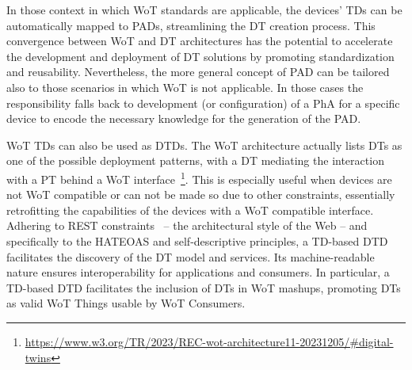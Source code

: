 In those context in which \ac{WoT} standards are applicable, the devices' \acp{TD} can be automatically mapped to \acp{PAD}, streamlining the \ac{DT} creation process.
%
This convergence between \ac{WoT} and \ac{DT} architectures has the potential to accelerate the development and deployment of \ac{DT} solutions by promoting standardization and reusability.
%
Nevertheless, the more general concept of \ac{PAD} can be tailored also to those scenarios in which \ac{WoT} is not applicable. In those cases the responsibility falls back to development (or configuration) of a \ac{PhA} for a specific device to encode the necessary knowledge for the generation of the \ac{PAD}.


\ac{WoT} \acp{TD} can also be used as \acp{DTD}.
The \ac{WoT} architecture actually lists \acp{DT} as one of the possible deployment patterns, with a \ac{DT} mediating the interaction with a \ac{PT} behind a \ac{WoT} interface~\footnote{\url{https://www.w3.org/TR/2023/REC-wot-architecture11-20231205/\#digital-twins}}.
%
This is especially useful when devices are not \ac{WoT} compatible or can not be made so due to other constraints, essentially retrofitting the capabilities of the devices with a \ac{WoT} compatible interface.
%
Adhering to REST constraints~\cite{fielding2002rest} -- the architectural style of the Web -- and specifically to the HATEOAS and self-descriptive principles, a \ac{TD}-based \ac{DTD} facilitates the discovery of the \ac{DT} model and services.
%
Its machine-readable nature ensures interoperability for applications and consumers.
%
In particular, a \ac{TD}-based \ac{DTD} facilitates the inclusion of \acp{DT} in \ac{WoT} mashups, promoting \acp{DT} as valid \ac{WoT} Things usable by \ac{WoT} Consumers.

